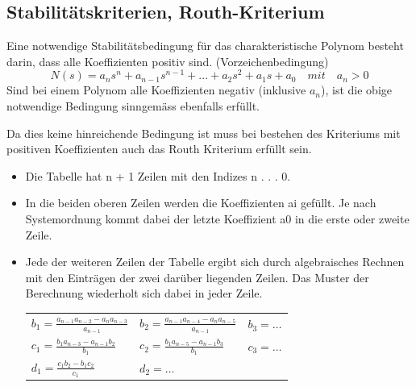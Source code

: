 \subsection{Stabilitätskriterien, Routh-Kriterium }

Eine notwendige Stabilitätsbedingung für das charakteristische Polynom besteht darin, dass alle Koeffizienten positiv sind. (Vorzeichenbedingung)
\begin{equation}
\boxed{N(s) = a_{n}s^n + a_{n-1}s^{n-1} + . . . + a_2s^2 + a_1s + a_0 \quad mit \quad a_n > 0}
\end{equation}
Sind bei einem Polynom alle Koeffizienten negativ (inklusive $a_n$), ist die obige
notwendige Bedingung sinngemäss ebenfalls erfüllt.



Da dies keine hinreichende Bedingung ist muss bei bestehen des Kriteriums mit positiven Koeffizienten auch das Routh Kriterium erfüllt sein.
\begin{itemize}
	\item Die Tabelle hat n + 1 Zeilen mit den Indizes n . . . 0.
	\item In die beiden oberen Zeilen werden die Koeffizienten ai gefüllt. Je nach Systemordnung
	kommt dabei der letzte Koeffizient a0 in die erste oder zweite Zeile.
	
	\item {Jede der weiteren Zeilen der Tabelle ergibt sich durch algebraisches Rechnen
	mit den Einträgen der zwei darüber liegenden Zeilen. Das Muster der Berechnung
	wiederholt sich dabei in jeder Zeile.\\
	\begin{tabularx}{\textwidth}{XXX}
	$b_1=\frac{a_{n-1}a_{n-2}-a_{n}a_{n-3}}{a_{n-1}}$
	& $b_2=\frac{a_{n-1}a_{n-4}-a_{n}a_{n-5}}{a_{n-1}}$
	& $b_3=\ldots$ \\
	$c_1=\frac{b_{1}a_{n-3}-a_{n-1}b_{2}}{b_{1}}$
	& $c_2=\frac{b_{1}a_{n-5}-a_{n-1}b_{3}}{b_{1}}$
	& $c_3=\ldots$ \\
	$d_1=\frac{c_{1}b_{2}-b_{1}c_{2}}{c_{1}}$
	& $d_2=\ldots$ & \\
	\end{tabularx}}
\end{itemize}


